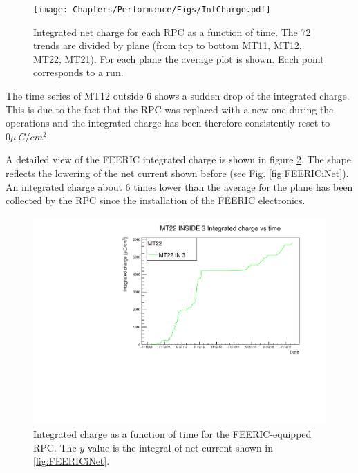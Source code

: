 \begin{figure}[!t]
\begin{center}
\texttt{[image: Chapters/Performance/Figs/IntCharge.pdf]}
\caption{Integrated net charge for each RPC as a function of time. The 72 trends are divided by plane (from top to bottom MT11, MT12, MT22, MT21). For each plane the average plot is shown. Each point corresponds to a run.}
\label{fig:ICharge4Planes}
\end{center}
\end{figure}


The time series of MT12 outside 6 shows a sudden drop of the integrated charge. 
This is due to the fact that the RPC was replaced with a new one during the operations and the integrated charge has been therefore consistently reset to $0\mu~C/cm^2$.

A detailed view of the FEERIC integrated charge is shown in figure \ref{fig:FEERICIntCharge}.
The shape reflects the lowering of the net current shown before (see Fig. \ref{fig:FEERICiNet}).
An integrated charge about $6$ times lower than the average for the plane has been collected by the RPC since the installation of the FEERIC electronics.

\begin{figure}[!t]
\begin{center}
\includegraphics[width=0.95\linewidth]{Chapters/Performance/Figs/IntChargeFEERIC.pdf}
\caption{Integrated charge as a function of time for the FEERIC-equipped RPC. The $y$ value is the integral of net current shown in \ref{fig:FEERICiNet}.}
\label{fig:FEERICIntCharge}
\end{center}
\end{figure}

